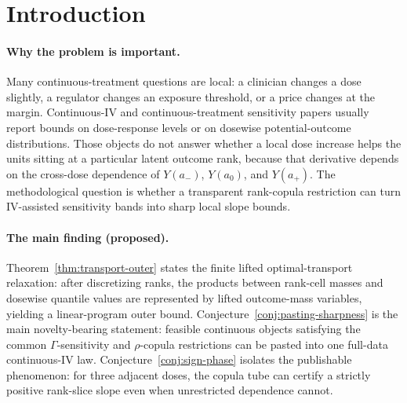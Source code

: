 \documentclass[11pt]{article}
\theoremstyle{definition}
\theoremstyle{plain}
\theoremstyle{remark}
\begin{document}
\begin{abstract}
Continuous instruments can reveal or bound dose-response marginals, but local causal slopes for units at a given potential-outcome rank also depend on how nearby potential outcomes are coupled across doses.  This proposal asks for sharp partial identification of a rank-slice marginal dose-response derivative when dosewise continuous-IV sensitivity bounds are combined with an explicit quantile-copula tube.  The proposed kernel is a sign-certification phenomenon: a narrow adjacent-dose rank tube can force a positive lower bound on a local slope even when every dosewise marginal mean band and every unrestricted-copula slope band still contains zero.  The routine part is a finite lifted optimal-transport relaxation that is a valid outer envelope; the open part is the continuous-IV sensitivity pasting theorem showing when the envelope is sharp for one full-data law rather than only for separately optimized dose marginals.  If resolved, the result would give practitioners a checkable certificate for local dose-response monotonicity under bounded unmeasured confounding.
\end{abstract}

\section{Introduction}
\paragraph{Why the problem is important.}
Many continuous-treatment questions are local: a clinician changes a dose slightly, a regulator changes an exposure threshold, or a price changes at the margin.  Continuous-IV and continuous-treatment sensitivity papers usually report bounds on dose-response levels or on dosewise potential-outcome distributions.  Those objects do not answer whether a local dose increase helps the units sitting at a particular latent outcome rank, because that derivative depends on the cross-dose dependence of \(Y(a_-)\), \(Y(a_0)\), and \(Y(a_+)\).  The methodological question is whether a transparent rank-copula restriction can turn IV-assisted sensitivity bands into sharp local slope bounds.

\paragraph{The main finding (proposed).}
Theorem~\ref{thm:transport-outer} states the finite lifted optimal-transport relaxation: after discretizing ranks, the products between rank-cell masses and dosewise quantile values are represented by lifted outcome-mass variables, yielding a linear-program outer bound.  Conjecture~\ref{conj:pasting-sharpness} is the main novelty-bearing statement: feasible continuous objects satisfying the common \(\Gamma\)-sensitivity and \(\rho\)-copula restrictions can be pasted into one full-data continuous-IV law.  Conjecture~\ref{conj:sign-phase} isolates the publishable phenomenon: for three adjacent doses, the copula tube can certify a strictly positive rank-slice slope even when unrestricted dependence cannot.
\end{document}
